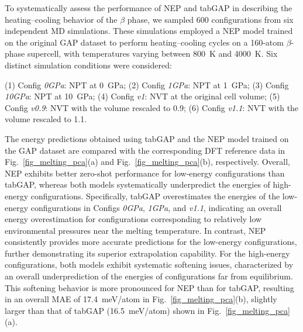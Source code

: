 \documentclass[aip,graphicx,amsmath,amssymb]{revtex4-1}
\begin{document}
To systematically assess the performance of NEP and tabGAP in describing the
heating--cooling behavior of the $\beta$ phase, we sampled 600 configurations from six
independent MD simulations.
These simulations employed a NEP model trained on the original GAP dataset to perform 
heating--cooling cycles on a 160-atom $\beta$-phase supercell, with temperatures varying 
between 800~K and 4000~K. 
Six distinct simulation conditions were considered:

\noindent
(1) Config \textit{0GPa}: NPT at 0~GPa; \newline
(2) Config \textit{1GPa}: NPT at 1~GPa; \newline
(3) Config \textit{10GPa}: NPT at 10~GPa; \newline
(4) Config \textit{v1}: NVT at the original cell volume; \newline
(5) Config \textit{v0.9}: NVT with the volume rescaled to 0.9; \newline
(6) Config \textit{v1.1}: NVT with the volume rescaled to 1.1. 

The energy predictions obtained using tabGAP and the NEP model trained on the GAP dataset
are compared with the corresponding DFT reference data in
Fig.~\ref{fig_melting_pca}(a) and Fig.~\ref{fig_melting_pca}(b), respectively.
Overall, NEP exhibits better zero-shot performance for low-energy configurations than
tabGAP, whereas both models systematically underpredict the energies of high-energy
configurations.
Specifically, tabGAP overestimates the energies of the low-energy configurations in
Configs \textit{0GPa}, \textit{1GPa}, and \textit{v1.1}, indicating an overall energy
overestimation for configurations corresponding to relatively low environmental pressures
near the melting temperature.
In contrast, NEP consistently provides more accurate predictions for the low-energy
configurations, further demonstrating its superior extrapolation capability.
For the high-energy configurations, both models exhibit systematic softening 
issues,\cite{deng_systematic_2024} characterized by an overall underprediction
of the energies of configurations far from equilibrium.
This softening behavior is more pronounced for NEP than for tabGAP, resulting in an overall
MAE of 17.4~meV/atom in Fig.~\ref{fig_melting_pca}(b), slightly larger than that of tabGAP
(16.5~meV/atom) shown in Fig.~\ref{fig_melting_pca}(a).
\end{document}
